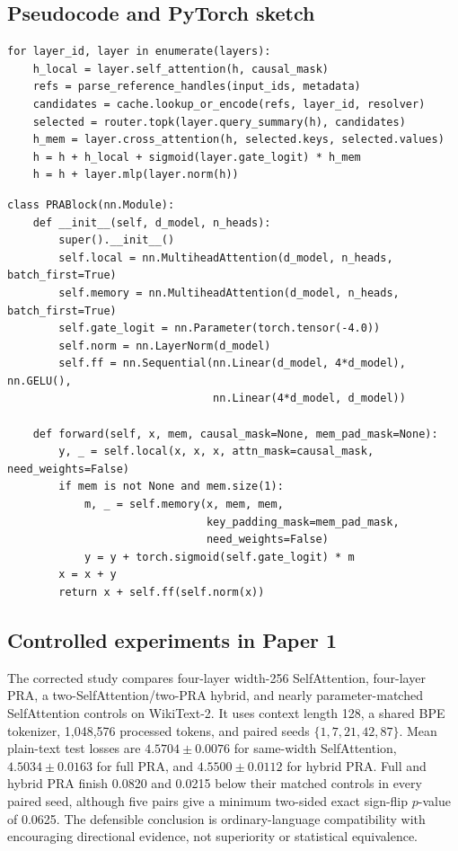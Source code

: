 \documentclass[10pt,a4paper]{article}
\begin{document}
\subsection{Pseudocode and PyTorch sketch}
\begin{lstlisting}[caption={PRA layer pseudocode}]
for layer_id, layer in enumerate(layers):
    h_local = layer.self_attention(h, causal_mask)
    refs = parse_reference_handles(input_ids, metadata)
    candidates = cache.lookup_or_encode(refs, layer_id, resolver)
    selected = router.topk(layer.query_summary(h), candidates)
    h_mem = layer.cross_attention(h, selected.keys, selected.values)
    h = h + h_local + sigmoid(layer.gate_logit) * h_mem
    h = h + layer.mlp(layer.norm(h))
\end{lstlisting}
\begin{lstlisting}[caption={Minimal educational PRA module}]
class PRABlock(nn.Module):
    def __init__(self, d_model, n_heads):
        super().__init__()
        self.local = nn.MultiheadAttention(d_model, n_heads, batch_first=True)
        self.memory = nn.MultiheadAttention(d_model, n_heads, batch_first=True)
        self.gate_logit = nn.Parameter(torch.tensor(-4.0))
        self.norm = nn.LayerNorm(d_model)
        self.ff = nn.Sequential(nn.Linear(d_model, 4*d_model), nn.GELU(),
                                nn.Linear(4*d_model, d_model))

    def forward(self, x, mem, causal_mask=None, mem_pad_mask=None):
        y, _ = self.local(x, x, x, attn_mask=causal_mask, need_weights=False)
        if mem is not None and mem.size(1):
            m, _ = self.memory(x, mem, mem,
                               key_padding_mask=mem_pad_mask,
                               need_weights=False)
            y = y + torch.sigmoid(self.gate_logit) * m
        x = x + y
        return x + self.ff(self.norm(x))
\end{lstlisting}

\subsection{Controlled experiments in Paper 1}
The corrected study compares four-layer width-256 SelfAttention, four-layer PRA, a two-SelfAttention/two-PRA hybrid, and nearly parameter-matched SelfAttention controls on WikiText-2. It uses context length 128, a shared BPE tokenizer, 1,048,576 processed tokens, and paired seeds $\{1,7,21,42,87\}$. Mean plain-text test losses are $4.5704\pm0.0076$ for same-width SelfAttention, $4.5034\pm0.0163$ for full PRA, and $4.5500\pm0.0112$ for hybrid PRA. Full and hybrid PRA finish 0.0820 and 0.0215 below their matched controls in every paired seed, although five pairs give a minimum two-sided exact sign-flip $p$-value of 0.0625. The defensible conclusion is ordinary-language compatibility with encouraging directional evidence, not superiority or statistical equivalence.
\end{document}
